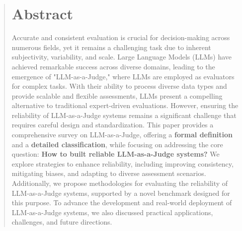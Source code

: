 \documentclass[acmsmall,screen]{acmart}
\begin{document}
\renewcommand{\shortauthors}{J. Gu, X. Jiang, Z. Shi, J. Guo, et al.}






\begin{abstract}\label{abstract}

\section*{Abstract}
Accurate and consistent evaluation is crucial for decision-making across numerous fields, yet it remains a challenging task due to inherent subjectivity, variability, and scale. 
Large Language Models (LLMs) have achieved remarkable success across diverse domains, leading to the emergence of "LLM-as-a-Judge," where LLMs are employed as evaluators for complex tasks. With their ability to process diverse data types and provide scalable and flexible assessments, LLMs present a compelling alternative to traditional expert-driven evaluations. 
However, ensuring the reliability of LLM-as-a-Judge systems remains a significant challenge that requires careful design and standardization. 
This paper provides a comprehensive survey on LLM-as-a-Judge, offering a \textbf{formal definition} and a \textbf{detailed classification}, while focusing on addressing the core question: \textbf{How to built reliable LLM-as-a-Judge systems?} We explore strategies to enhance reliability, including improving consistency, mitigating biases, and adapting to diverse assessment scenarios. Additionally, we propose methodologies for evaluating the reliability of LLM-as-a-Judge systems, supported by a novel benchmark designed for this purpose. 
To advance the development and real-world deployment of LLM-as-a-Judge systems, we also discussed practical applications, challenges, and future directions. 


\end{abstract}
\end{document}
